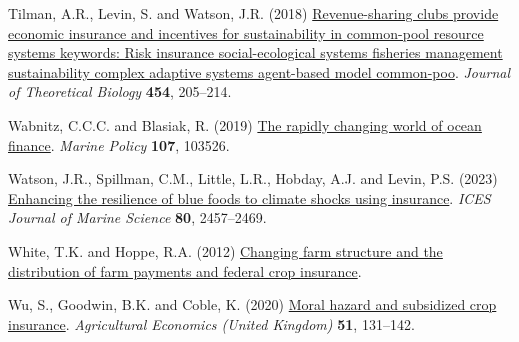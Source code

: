 \documentclass[
  letterpaper,
  DIV=11,
  numbers=noendperiod]{scrartcl}
\newlength{\cslhangindent}
\newenvironment{CSLReferences}[2] %
 {\begin{list}{}{%
  \setlength{\itemindent}{0pt}
  \setlength{\leftmargin}{0pt}
  \setlength{\parsep}{0pt}
  \ifodd #1
   \setlength{\leftmargin}{\cslhangindent}
   \setlength{\itemindent}{-1\cslhangindent}
  \fi
  \setlength{\itemsep}{#2\baselineskip}}}
 {\end{list}}
\theoremstyle{plain}
\theoremstyle{plain}
\theoremstyle{remark}
\begin{document}
\begin{CSLReferences}{1}{0}
Tilman, A.R., Levin, S. and Watson, J.R. (2018)
\href{https://doi.org/10.1016/j.jtbi.2018.06.003}{Revenue-sharing clubs
provide economic insurance and incentives for sustainability in
common-pool resource systems keywords: Risk insurance social-ecological
systems fisheries management sustainability complex adaptive systems
agent-based model common-poo}. \emph{Journal of Theoretical Biology}
\textbf{454}, 205--214.

Wabnitz, C.C.C. and Blasiak, R. (2019)
\href{https://doi.org/10.1016/j.marpol.2019.103526}{The rapidly changing
world of ocean finance}. \emph{Marine Policy} \textbf{107}, 103526.

Watson, J.R., Spillman, C.M., Little, L.R., Hobday, A.J. and Levin, P.S.
(2023) \href{https://doi.org/10.1093/icesjms/fsad175}{Enhancing the
resilience of blue foods to climate shocks using insurance}. \emph{ICES
Journal of Marine Science} \textbf{80}, 2457--2469.

White, T.K. and Hoppe, R.A. (2012)
\href{https://www.ers.usda.gov}{Changing farm structure and the
distribution of farm payments and federal crop insurance}.

Wu, S., Goodwin, B.K. and Coble, K. (2020)
\href{https://doi.org/10.1111/agec.12545}{Moral hazard and subsidized
crop insurance}. \emph{Agricultural Economics (United Kingdom)}
\textbf{51}, 131--142.

\end{CSLReferences}
\end{document}
